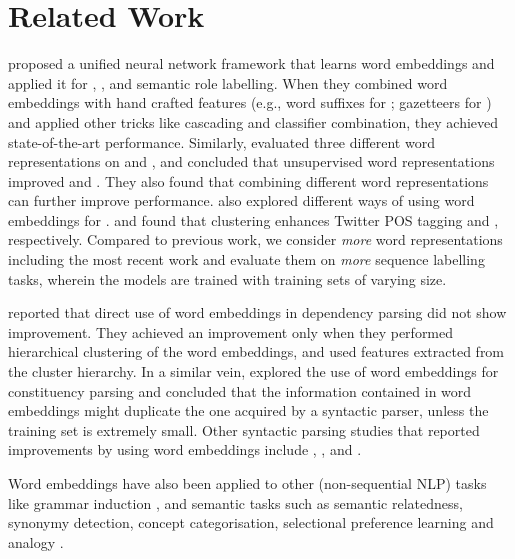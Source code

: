 \section{Related Work}

 proposed a unified neural network framework
that learns word embeddings and applied it for \pos, \chunking, \ner and semantic role labelling. 
When they combined word embeddings with hand crafted features
(e.g., word suffixes for \pos;  gazetteers for \ner) and applied other
tricks like cascading and classifier combination, they achieved state-of-the-art performance.
Similarly,  evaluated three different word representations on \ner and \chunking, and concluded that unsupervised word representations improved \ner and \chunking. They also found that combining different word representations can further improve performance.  also explored different ways of using word embeddings for \ner.   and  found that \brown clustering enhances Twitter POS tagging and \mwe, respectively. Compared to previous work, we consider \textit{more} word representations including the most recent work and evaluate them on \textit{more} sequence labelling tasks, wherein the models are trained with training sets of varying size.

 reported that direct use of word embeddings in dependency parsing did not show improvement. They achieved an improvement only when they performed hierarchical clustering of the word embeddings, and used features extracted from the cluster hierarchy.
In a similar vein,  explored the use of word embeddings for constituency parsing and concluded that the
information contained in word embeddings might duplicate the one acquired by a
syntactic parser, unless the training set is extremely small.
Other syntactic parsing studies that reported improvements by using
word embeddings include , ,
 and .

Word embeddings have also been applied to other (non-sequential NLP)
tasks like grammar induction \cite{Spitkovsky:2011}, and semantic tasks
such as semantic relatedness, synonymy detection, concept
categorisation, selectional preference learning and analogy \cite{baroni:2014}.

